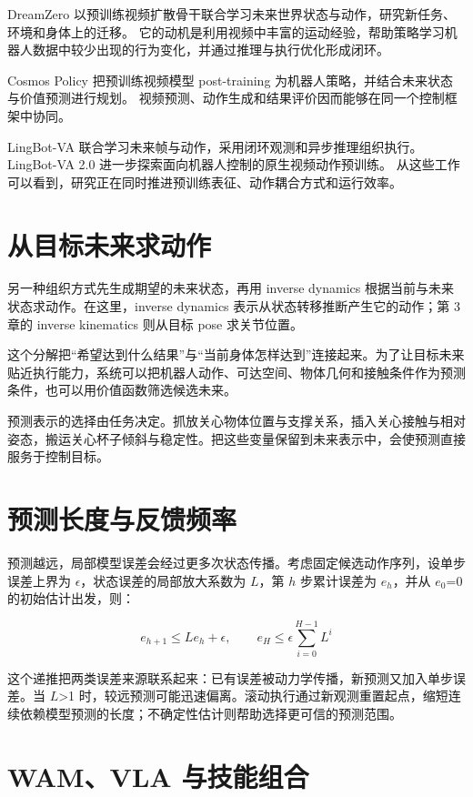 \documentclass[UTF8,a4paper,11pt,oneside,openany,fontset=none]{ctexbook}
\begin{document}
DreamZero 以预训练视频扩散骨干联合学习未来世界状态与动作，研究新任务、环境和身体上的迁移。\cite{R27} 它的动机是利用视频中丰富的运动经验，帮助策略学习机器人数据中较少出现的行为变化，并通过推理与执行优化形成闭环。

Cosmos Policy 把预训练视频模型 post-training 为机器人策略，并结合未来状态与价值预测进行规划。\cite{R28} 视频预测、动作生成和结果评价因而能够在同一个控制框架中协同。

LingBot-VA 联合学习未来帧与动作，采用闭环观测和异步推理组织执行。\cite{R29} LingBot-VA 2.0 进一步探索面向机器人控制的原生视频动作预训练。\cite{R30} 从这些工作可以看到，研究正在同时推进预训练表征、动作耦合方式和运行效率。

\section{从目标未来求动作}

另一种组织方式先生成期望的未来状态，再用 inverse dynamics 根据当前与未来状态求动作。在这里，inverse dynamics 表示从状态转移推断产生它的动作；第 3 章的 inverse kinematics 则从目标 pose 求关节位置。

这个分解把``希望达到什么结果''与``当前身体怎样达到''连接起来。为了让目标未来贴近执行能力，系统可以把机器人动作、可达空间、物体几何和接触条件作为预测条件，也可以用价值函数筛选候选未来。

预测表示的选择由任务决定。抓放关心物体位置与支撑关系，插入关心接触与相对姿态，搬运关心杯子倾斜与稳定性。把这些变量保留到未来表示中，会使预测直接服务于控制目标。

\section{预测长度与反馈频率}

预测越远，局部模型误差会经过更多次状态传播。考虑固定候选动作序列，设单步误差上界为 \(\epsilon\)，状态误差的局部放大系数为 \(L\)，第 \(h\) 步累计误差为 \(e_{h}\)，并从 \(e_{0}\)=0 的初始估计出发，则：

\[
e_{h+1}\le L e_h+\epsilon,\qquad e_H\le\epsilon\sum_{i=0}^{H-1}L^i
\]

这个递推把两类误差来源联系起来：已有误差被动力学传播，新预测又加入单步误差。当 \(L\)\textgreater1 时，较远预测可能迅速偏离。滚动执行通过新观测重置起点，缩短连续依赖模型预测的长度；不确定性估计则帮助选择更可信的预测范围。

\section{WAM、VLA 与技能组合}\label{wamvla-ux4e0eux6280ux80fdux7ec4ux5408}
\end{document}
